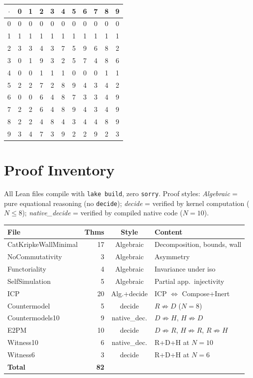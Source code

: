 \documentclass[a4paper,UKenglish,cleveref,autoref,thm-restate]{lipics-v2021}
\newcommand{\dotop}{\cdot}
\begin{document}
\medskip
{\footnotesize
\begin{tabular}{c|cccccccccc}
$\dotop$ & 0 & 1 & 2 & 3 & 4 & 5 & 6 & 7 & 8 & 9 \\\hline
0 & 0 & 0 & 0 & 0 & 0 & 0 & 0 & 0 & 0 & 0 \\
1 & 1 & 1 & 1 & 1 & 1 & 1 & 1 & 1 & 1 & 1 \\
2 & 3 & 3 & 4 & 3 & 7 & 5 & 9 & 6 & 8 & 2 \\
3 & 0 & 1 & 9 & 3 & 2 & 5 & 7 & 4 & 8 & 6 \\
4 & 0 & 0 & 1 & 1 & 1 & 0 & 0 & 0 & 1 & 1 \\
5 & 2 & 2 & 7 & 2 & 8 & 9 & 4 & 3 & 4 & 2 \\
6 & 0 & 0 & 6 & 4 & 8 & 7 & 3 & 3 & 4 & 9 \\
7 & 2 & 2 & 6 & 4 & 8 & 9 & 4 & 3 & 4 & 9 \\
8 & 2 & 2 & 4 & 8 & 4 & 3 & 4 & 4 & 8 & 9 \\
9 & 3 & 4 & 7 & 3 & 9 & 2 & 2 & 9 & 2 & 3 \\
\end{tabular}}

\section{Proof Inventory}
\label{app:inventory}

All Lean files compile with \texttt{lake build}, zero \texttt{sorry}. Proof styles: \emph{Algebraic} = pure equational reasoning (no \texttt{decide}); \emph{decide} = verified by kernel computation ($N \leq 8$); \emph{native\_decide} = verified by compiled native code ($N = 10$).

\medskip
{\small
\begin{tabular}{lrcl}
\textbf{File} & \textbf{Thms} & \textbf{Style} & \textbf{Content} \\
\hline
CatKripkeWallMinimal & 17 & Algebraic & Decomposition, bounds, wall \\
NoCommutativity      &  3 & Algebraic & Asymmetry \\
Functoriality        &  4 & Algebraic & Invariance under iso \\
SelfSimulation       &  5 & Algebraic & Partial app.\ injectivity \\
ICP                  & 20 & Alg.+decide & ICP $\Leftrightarrow$ Compose+Inert \\
Countermodel         &  5 & decide & $R \not\Rightarrow D$ ($N\!=\!8$) \\
Countermodels10      &  9 & native\_dec. & $D \not\Rightarrow H$, $H \not\Rightarrow D$ \\
E2PM                 & 10 & decide & $D \not\Rightarrow R$, $H \not\Rightarrow R$, $R \not\Rightarrow H$ \\
Witness10            &  6 & native\_dec. & R+D+H at $N\!=\!10$ \\
Witness6             &  3 & decide & R+D+H at $N\!=\!6$ \\
\hline
\textbf{Total}       & \textbf{82} & & \\
\end{tabular}}
\end{document}
